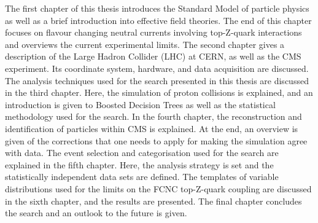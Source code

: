 The first chapter of this thesis introduces the Standard Model of particle physics as well as a brief introduction into effective field theories. The end of this chapter focuses on flavour changing neutral currents involving top-Z-quark interactions and overviews the current experimental limits.  The second chapter gives a description of the Large Hadron Collider (LHC) at CERN, as well as the CMS experiment. Its coordinate system, hardware, and data acquisition are discussed. The analysis techniques used for the search  presented in this thesis are discussed in the third chapter. Here, the simulation of proton collisions is explained, and an introduction is given to Boosted Decision Trees as well as the statistical methodology used for the search. In the fourth chapter, the reconstruction and identification of particles within CMS is explained. At the end, an overview is given of the corrections that one needs to apply for making the simulation agree with data. The event selection and categorisation used for the search are explained in the fifth chapter. Here, the analysis strategy is set and the statistically independent data sets are defined. The templates of variable distributions used for the limits on the FCNC top-Z-quark coupling are discussed in the sixth chapter, and the results are presented. The final chapter concludes the search and an outlook to the future is given. 